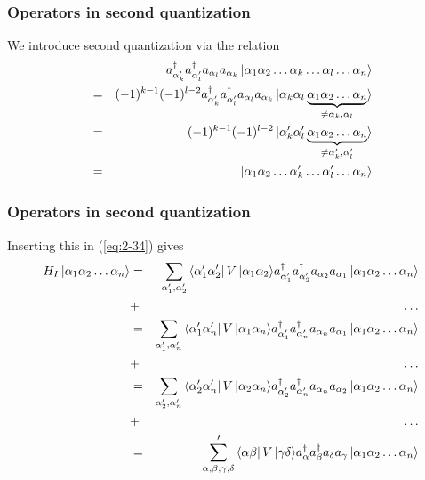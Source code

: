 \frame
{
  \frametitle{Operators in second quantization}
\begin{small}
{\scriptsize
We introduce second quantization via the relation
\begin{eqnarray}
	&& a_{\alpha_k'}^\dagger a_{\alpha_l'}^\dagger a_{\alpha_l} a_{\alpha_k} 
		\ket{\alpha_1\alpha_2\hdots\alpha_k\hdots\alpha_l\hdots\alpha_n} \nonumber \\
	&=& (-1)^{k-1} (-1)^{l-2} a_{\alpha_k'}^\dagger a_{\alpha_l'}^\dagger a_{\alpha_l} a_{\alpha_k}
		\ket{\alpha_k\alpha_l \underbrace{\alpha_1\alpha_2\hdots\alpha_n}_{\neq \alpha_k,\alpha_l}} \nonumber \\
	&=& (-1)^{k-1} (-1)^{l-2} 
	\ket{\alpha_k'\alpha_l' \underbrace{\alpha_1\alpha_2\hdots\alpha_n}_{\neq \alpha_k',\alpha_l'}} \nonumber \\
	&=& \ket{\alpha_1\alpha_2\hdots\alpha_k'\hdots\alpha_l'\hdots\alpha_n} \label{eq:2-35}
\end{eqnarray}
}
\end{small}
}


\frame
{
  \frametitle{Operators in second quantization}
\begin{small}
{\scriptsize
Inserting this in (\ref{eq:2-34}) gives
\begin{eqnarray}
	H_I \ket{\alpha_1\alpha_2\hdots\alpha_n}
	&=& \sum_{\alpha_1', \alpha_2'} \element{\alpha_1'\alpha_2'}{V}{\alpha_1\alpha_2}
		a_{\alpha_1'}^\dagger a_{\alpha_2'}^\dagger a_{\alpha_2} a_{\alpha_1}
		\ket{\alpha_1\alpha_2\hdots\alpha_n} \nonumber \\
	&+& \hdots \nonumber \\
	&=& \sum_{\alpha_1', \alpha_n'} \element{\alpha_1'\alpha_n'}{V}{\alpha_1\alpha_n}
		a_{\alpha_1'}^\dagger a_{\alpha_n'}^\dagger a_{\alpha_n} a_{\alpha_1}
		\ket{\alpha_1\alpha_2\hdots\alpha_n} \nonumber \\
	&+& \hdots \nonumber \\
	&=& \sum_{\alpha_2', \alpha_n'} \element{\alpha_2'\alpha_n'}{V}{\alpha_2\alpha_n}
		a_{\alpha_2'}^\dagger a_{\alpha_n'}^\dagger a_{\alpha_n} a_{\alpha_2}
		\ket{\alpha_1\alpha_2\hdots\alpha_n} \nonumber \\
	&+& \hdots \nonumber \\
	&=& \sum_{\alpha, \beta, \gamma, \delta} ' \element{\alpha\beta}{V}{\gamma\delta}
		a^\dagger_\alpha a^\dagger_\beta a_\delta a_\gamma
		\ket{\alpha_1\alpha_2\hdots\alpha_n} \label{eq:2-36}
\end{eqnarray}
}
\end{small}
}


